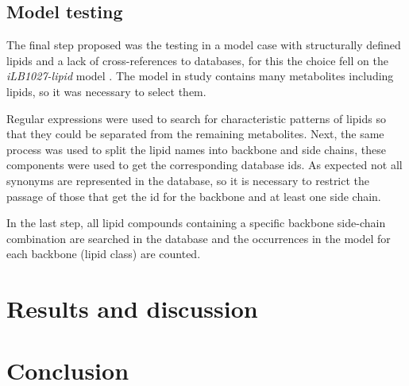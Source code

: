\documentclass{llncs}
\begin{document}
\subsection{Model testing}

The final step proposed was the testing in a model case with structurally defined lipids and a lack of cross-references to databases, for this the choice fell on the \textit{iLB1027-lipid} model \cite{Levering2016}.
The model in study contains many metabolites including lipids, so it was necessary to select them. 

Regular expressions were used to search for characteristic patterns of lipids so that they could be separated from the remaining metabolites.
Next, the same process was used to split the lipid names into backbone and side chains, these components were used to get the corresponding database ids. 
As expected not all synonyms are represented in the database, so it is necessary to restrict the passage of those that get the id for the backbone and at least one side chain.

In the last step, all lipid compounds containing a specific backbone side-chain combination are searched in the database and the occurrences in the model for each backbone (lipid class) are counted.


\section{Results and discussion}

\section{Conclusion}





\end{document}
